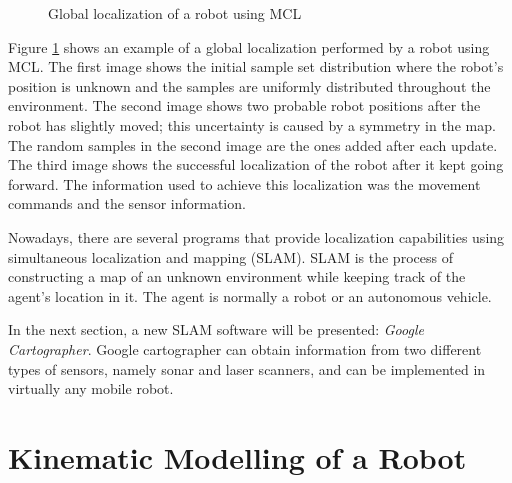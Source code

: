 \begin{figure}[H]
	\centering
	\begin{subfigure}[][Initialization]
		{\texttt{[image: position1.png]}}
	\end{subfigure}
	\begin{subfigure}[][Uncertainty due to symmetry]
		{\label{subfig:goal}
		\texttt{[image: position2.png]}}
	\end{subfigure}
	\begin{subfigure}[][Final localization]
		{\label{subfig:goal}
		\texttt{[image: position3.png]}}
	\end{subfigure}
	\vspace{-12pt}
	\caption{Global localization of a robot using MCL}
	\vspace{-15pt}
	\label{fig:example}
\end{figure}
\vspace{-8pt}

Figure \ref{fig:example} shows an example of a global localization performed by a robot using MCL. The first image shows the initial sample set distribution where the robot's position is unknown and the samples are uniformly distributed throughout the environment. The second image shows two probable robot positions after the robot has slightly moved; this uncertainty is caused by a symmetry in the map. The random samples in the second image are the ones added after each update. The third image shows the successful localization of the robot after it kept going forward. The information used to achieve this localization was the movement commands and the sensor information.

Nowadays, there are several programs that provide localization capabilities using simultaneous localization and mapping (SLAM). SLAM is the process of constructing a map of an unknown environment while keeping track of the agent's location in it. The agent is normally a robot or an autonomous vehicle.

In the next section, a new SLAM software will be presented: \textit{Google Cartographer}. Google cartographer can obtain information from two different types of sensors, namely sonar and laser scanners, and can be implemented in virtually any mobile robot.

\section{Kinematic Modelling of a Robot}

